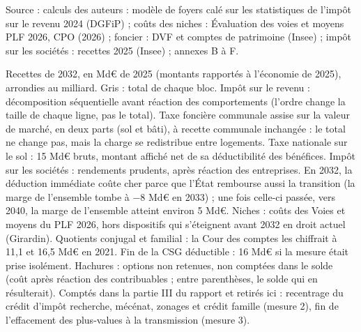 Source : calculs des auteurs : modèle de foyers calé sur les statistiques de l'impôt sur le revenu 2024 (DGFiP) ; coûts des niches : Évaluation des voies et moyens PLF 2026, CPO (2026) ; foncier : DVF et comptes de patrimoine (Insee) ; impôt sur les sociétés : recettes 2025 (Insee) ; annexes B à F.\par Recettes de 2032, en Md€ de 2025 (montants rapportés à l'économie de 2025), arrondies au milliard. Gris : total de chaque bloc. Impôt sur le revenu : décomposition séquentielle avant réaction des comportements (l'ordre change la taille de chaque ligne, pas le total). Taxe foncière communale assise sur la valeur de marché, en deux parts (sol et bâti), à recette communale inchangée : le total ne change pas, mais la charge se redistribue entre logements. Taxe nationale sur le sol : 15 Md€ bruts, montant affiché net de sa déductibilité des bénéfices. Impôt sur les sociétés : rendements prudents, après réaction des entreprises. En 2032, la déduction immédiate coûte cher parce que l'État rembourse aussi la transition (la marge de l'ensemble tombe à −8 Md€ en 2033) ; une fois celle-ci passée, vers 2040, la marge de l'ensemble atteint environ 5 Md€. Niches : coûts des Voies et moyens du PLF 2026, hors dispositifs qui s'éteignent avant 2032 en droit actuel (Girardin). Quotients conjugal et familial : la Cour des comptes les chiffrait à 11,1 et 16,5 Md€ en 2021. Fin de la CSG déductible : 16 Md€ si la mesure était prise isolément. Hachures : options non retenues, non comptées dans le solde (coût après réaction des contribuables ; entre parenthèses, le solde qui en résulterait). Comptés dans la partie III du rapport et retirés ici : recentrage du crédit d'impôt recherche, mécénat, zonages et crédit famille (mesure 2), fin de l'effacement des plus-values à la transmission (mesure 3).

